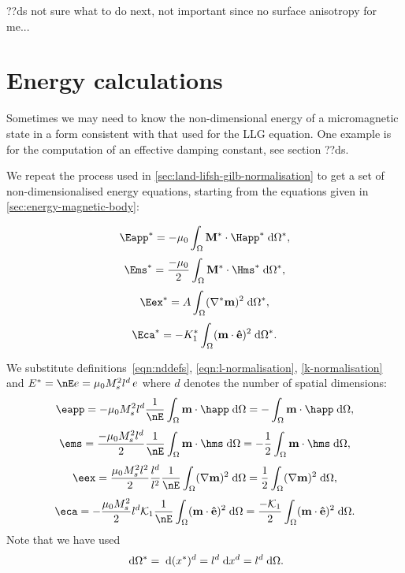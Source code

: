 ??ds not sure what to do next, not important since no surface anisotropy for me...



\section{Energy calculations}
\label{sec:energy-calculations}

Sometimes we may need to know the non-dimensional energy of a micromagnetic state in a form consistent with that used for the LLG equation. One example is for the computation of an effective damping constant, see section ??ds.

We repeat the process used in \autoref{sec:land-lifsh-gilb-normalisation} to get a set of non-dimensionalised energy equations, starting from the equations given in \autoref{sec:energy-magnetic-body}:

\begin{equation*}
  \Eapp^* = - \mu_0 \int_{\magd} \Mv^* \cdot \Happ^* \d \magd^*,
\end{equation*}
\begin{equation}
  \Ems^* =  \frac{-\mu_0}{2} \int_{\magd} \Mv^* \cdot \Hms^* \d \magd^*,
\end{equation}
\begin{equation*}
  \Eex^* =  \Exchc \int_{\magd} (\nabla^* \mv)^2 \d \magd^*,
\end{equation*}
\begin{equation*}
  \Eca^* =  -\Kone^* \int_\magd (\mv \cdot \ev)^2 \d \magd^*.
\end{equation*}

We substitute definitions~\eqref{eqn:nddefs}, \eqref{eqn:l-normalisation}, \eqref{k-normalisation} and $E^* = \nE e = \mu_0 M_s^2 l^d \, e$ where $d$ denotes the number of spatial dimensions:
\begin{equation*}
  \eapp = -\mu_0 M_s^2 l^d \frac{1}{\nE} \int_{\magd} \mv \cdot \happ \d \magd
  = - \int_{\magd} \mv \cdot \happ \d \magd,
\end{equation*}
\begin{equation}
  \ems = \frac{-\mu_0 M_s^2 l^d}{2} \frac{1}{\nE} \int_{\magd} \mv \cdot \hms \d \magd
  = -\frac{1}{2} \int_{\magd} \mv \cdot \hms \d \magd,
\end{equation}
\begin{equation*}
  \eex =  \frac{\mu_0 M_s^2 l^2}{2} \frac{l^d}{l^2} \frac{1}{\nE} \int_{\magd} (\nabla \mv)^2 \d \magd
  = \frac{1}{2} \int_{\magd} (\nabla \mv)^2 \d \magd,
\end{equation*}
\begin{equation*}
  \eca = - \frac{\mu_0 M_s^2}{2 } l^d \kone \frac{1}{\nE} \int_\magd (\mv \cdot \ev)^2 \d \magd
  = \frac{-\kone}{2} \int_\magd (\mv \cdot \ev)^2 \d \magd.
\end{equation*}
Note that we have used
\begin{equation}
  {\; \text{d}} \Omega^* = {\; \text{d}} (x^*)^d = l^d {\; \text{d}} x^d = l^d {\; \text{d}} \Omega.
\end{equation}



